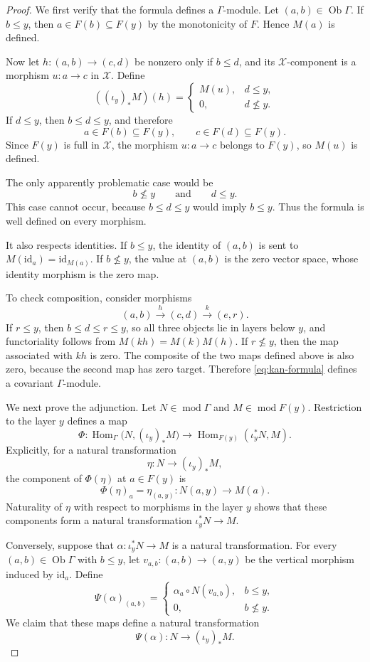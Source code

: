 \documentclass[10pt,a4paper]{amsart}
\newcommand{\G}{\Gamma}
\newcommand{\Hom}{\operatorname{Hom}}
\newcommand{\X}{\mathcal X}
\newcommand{\id}{\mathrm{id}}
\newcommand{\modu}{\operatorname{mod}}
\begin{document}
\begin{proof}
We first verify that the formula defines a $\G$-module. Let $(a,b)\in\operatorname{Ob}\G$.
If $b\leq y$, then $a\in F(b)\subseteq F(y)$
by the monotonicity of $F$. Hence $M(a)$ is defined.

Now let $h:(a,b)\longrightarrow(c,d)$ be nonzero only if
$b\leq d$, and its $\X$-component is a morphism
$ u:a\longrightarrow c$
in $\X$. Define
\[
((\iota_y)_*M)(h)
=
\begin{cases}
M(u), & d\leq y,\\
0,    & d\nleq y.
\end{cases}
\]
If $d\leq y$, then $b\leq d\leq y$, and therefore
\[
a\in F(b)\subseteq F(y),
\qquad
c\in F(d)\subseteq F(y).
\]
Since $F(y)$ is full in $\X$, the morphism $u:a\to c$ belongs to
$F(y)$, so $M(u)$ is defined.

The only apparently problematic case would be
\[
b\nleq y
\qquad\text{and}\qquad
d\leq y.
\]
This case cannot occur, because $b\leq d\leq y$ would imply
$b\leq y$. Thus the formula is well defined on every morphism.

It also respects identities. If $b\leq y$, the identity of $(a,b)$ is
sent to $M(\id_a)=\id_{M(a)}$.
If $b\nleq y$, the value at $(a,b)$ is the zero vector space, whose
identity morphism is the zero map.

To check composition, consider morphisms
\[
(a,b)\xrightarrow{h}(c,d)\xrightarrow{k}(e,r).
\]
If $r\leq y$, then $b\leq d\leq r\leq y$,
so all three objects lie in layers below $y$, and functoriality follows
from $M(kh)=M(k)M(h)$.
If $r\nleq y$, then the map associated with $kh$ is zero. The composite
of the two maps defined above is also zero, because the second map has
zero target. Therefore \eqref{eq:kan-formula} defines a covariant
$\G$-module.

We next prove the adjunction. Let $N\in\modu\G$ and
$M\in\modu F(y)$. Restriction to the layer $y$ defines a map
\[
\Phi:
\Hom_{\G}\bigl(N,(\iota_y)_*M\bigr)
\longrightarrow
\Hom_{F(y)}(\iota_y^*N,M).
\]
Explicitly, for a natural transformation
\[
\eta:N\longrightarrow(\iota_y)_*M,
\]
the component of $\Phi(\eta)$ at $a\in F(y)$ is
\[
\Phi(\eta)_a=\eta_{(a,y)}:
N(a,y)\longrightarrow M(a).
\]
Naturality of $\eta$ with respect to morphisms in the layer $y$ shows
that these components form a natural transformation $\iota_y^*N\longrightarrow M$.


Conversely, suppose that $\alpha:\iota_y^*N\longrightarrow M$
is a natural transformation. For every $(a,b)\in\operatorname{Ob}\G$
with $b\leq y$, let $v_{a,b}:(a,b)\longrightarrow(a,y)$
be the vertical morphism induced by $\id_a$. Define
\[
\Psi(\alpha)_{(a,b)}
=
\begin{cases}
\alpha_a\circ N(v_{a,b}), & b\leq y,\\
0,                         & b\nleq y.
\end{cases}
\]
We claim that these maps define a natural transformation
\[
\Psi(\alpha):N\longrightarrow(\iota_y)_*M.
\]


\end{proof}
\end{document}
